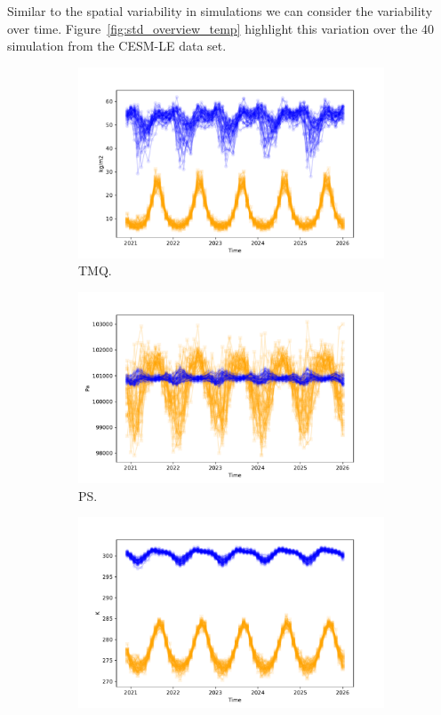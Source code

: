 Similar to the spatial variability in simulations we can consider the variability over time.
Figure~\ref{fig:std_overview_temp} highlight this variation over the 40 simulation from the CESM-LE data set. 

\begin{figure}[htbp!] 
	\centering
	\begin{subfigure}[b]{0.45\textwidth}
		\includegraphics[width=\textwidth]{TMQ_std_temp}
		\caption{TMQ.}
		\label{fig:std_precip_temp}   
	\end{subfigure}             
	\begin{subfigure}[b]{0.45\textwidth}
		\includegraphics[width=\textwidth]{PS_std_temp}
		\caption{PS.}
		\label{fig:std_pressure_temp}
	\end{subfigure}             
	\hfill
	\begin{subfigure}[b]{0.45\textwidth}
		\includegraphics[width=\textwidth]{TREFHT_std_temp}

\end{subfigure}
\end{figure}
